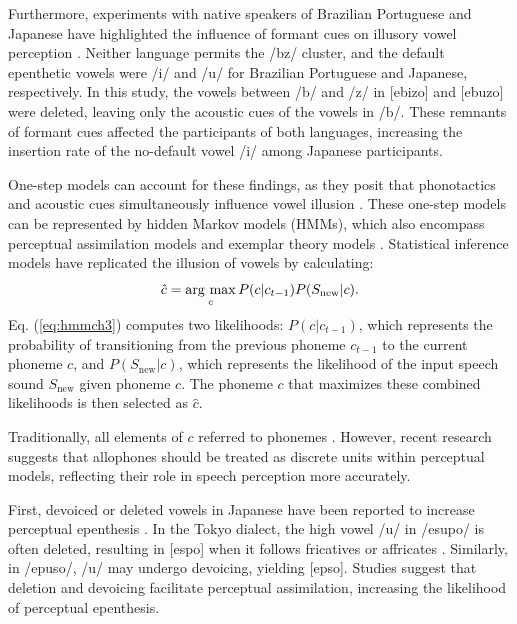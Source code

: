 Furthermore, experiments with native speakers of Brazilian Portuguese and Japanese have highlighted the influence of formant cues on illusory vowel perception \parencite{dupoux2011illusory}. Neither language permits the /bz/ cluster, and the default epenthetic vowels were /i/ and /u/ for Brazilian Portuguese and Japanese, respectively. In this study, the vowels between /b/ and /z/ in [ebizo] and [ebuzo] were deleted, leaving only the acoustic cues of the vowels in /b/. These remnants of formant cues affected the participants of both languages, increasing the insertion rate of the no-default vowel /i/ among Japanese participants.

One-step models can account for these findings, as they posit that phonotactics and acoustic cues simultaneously influence vowel illusion \parencite{dupoux2011illusory}. These one-step models can be represented by hidden Markov models (HMMs), which also encompass perceptual assimilation models \parencite{best2001discrimination} and exemplar theory models \parencite{lacerda1995perceptual}. Statistical inference models \parencite{feldman2009influence, wilson2013bayesian} have replicated the illusion of vowels \parencite{kishiyama2021influence} by calculating:
\begin{equation} \label{eq:hmmch3}
    \hat{c} = \mathop{\rm arg~max}\limits_{c} P(c | c_{t-1})P(S_{\text{new}}|c).
\end{equation}
Eq. (\ref{eq:hmmch3}) computes two likelihoods: $P(c|c_{t-1})$, which represents the probability of transitioning from the previous phoneme $c_{t-1}$ to the current phoneme $c$, and $P(S_{\text{new}}|c)$, which represents the likelihood of the input speech sound $S_{\text{new}}$ given phoneme $c$. The phoneme $c$ that maximizes these combined likelihoods is then selected as $\hat{c}$.

Traditionally, all elements of $c$ referred to phonemes \parencite{wilson2013bayesian}.
However, recent research suggests that allophones should be treated as discrete units within perceptual models,
reflecting their role in speech perception more accurately.

First, devoiced or deleted vowels in Japanese have been reported to increase perceptual epenthesis \parencite{kilpatrick2018japanese}.  
In the Tokyo dialect, the high vowel /u/ in /esupo/ is often deleted, resulting in [espo] when it follows fricatives or affricates \parencite{fujimoto2003devoice_eng, shaw2018lingual}.  
Similarly, in /epuso/, /u/ may undergo devoicing, yielding [ep\textsubring{\textturnm}so].  
Studies suggest that deletion and devoicing facilitate perceptual assimilation, increasing the likelihood of perceptual epenthesis.  

